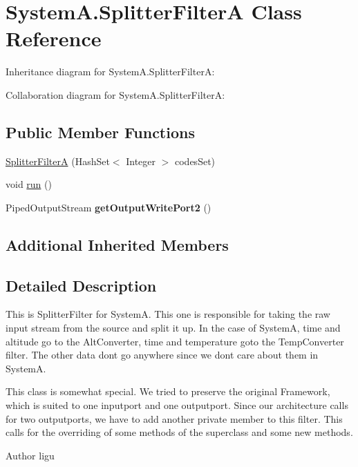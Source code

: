 \hypertarget{class_system_a_1_1_splitter_filter_a}{}\section{System\+A.\+Splitter\+Filter\+A Class Reference}
\label{class_system_a_1_1_splitter_filter_a}


Inheritance diagram for System\+A.\+Splitter\+Filter\+A\+:


Collaboration diagram for System\+A.\+Splitter\+Filter\+A\+:
\subsection*{Public Member Functions}
\begin{DoxyCompactItemize}
\item 
\hyperlink{class_system_a_1_1_splitter_filter_a_a79dc23af7be9dbb22286bce76cb79c18}{Splitter\+Filter\+A} (Hash\+Set$<$ Integer $>$ codes\+Set)
\item 
void \hyperlink{class_system_a_1_1_splitter_filter_a_a7ce43d0ac6d5aaf0c55f5d4417ec286a}{run} ()
\item 
\hypertarget{class_system_a_1_1_splitter_filter_a_abf1e9e0fb5fe6851c77d7724618cf81f}{}Piped\+Output\+Stream {\bfseries get\+Output\+Write\+Port2} ()\label{class_system_a_1_1_splitter_filter_a_abf1e9e0fb5fe6851c77d7724618cf81f}

\end{DoxyCompactItemize}
\subsection*{Additional Inherited Members}


\subsection{Detailed Description}
This is Splitter\+Filter for System\+A. This one is responsible for taking the raw input stream from the source and split it up. In the case of System\+A, time and altitude go to the Alt\+Converter, time and temperature goto the Temp\+Converter filter. The other data don\textquotesingle{}t go anywhere since we don\textquotesingle{}t care about them in System\+A.

This class is somewhat special. We tried to preserve the original Framework, which is suited to one inputport and one outputport. Since our architecture calls for two outputports, we have to add another private member to this filter. This calls for the overriding of some methods of the superclass and some new methods. \begin{DoxyAuthor}{Author}
ligu 
\end{DoxyAuthor}


